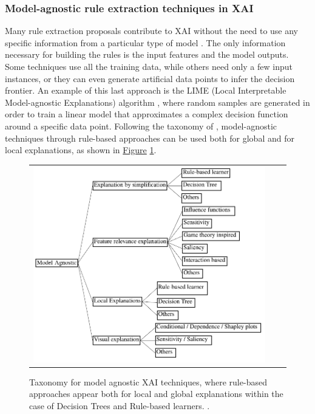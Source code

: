 \subsubsection{Model-agnostic rule extraction techniques in XAI}\label{subsubsec:ch2-sota-xai-rule-extraction-agnostic}
\leavevmode\newline
Many rule extraction proposals contribute to XAI without the need to use any specific information from a particular type of model \parencite{arrieta2020explainable}. The only information necessary for building the rules is the input features and the model outputs. Some techniques use all the training data, while others need only a few input instances, or they can even generate artificial data points to infer the decision frontier. An example of this last approach is the LIME (Local Interpretable Model-agnostic Explanations) algorithm \parencite{ribeiro2016should}, where random samples are generated in order to train a linear model that approximates a complex decision function around a specific data point. Following the taxonomy of \parencite{arrieta2020explainable}, model-agnostic techniques through rule-based approaches can be used both for global and for local explanations, as shown in \hyperref[fig:ModelAgnosticDiagram]{Figure} \ref{fig:ModelAgnosticDiagram}.

\begin{figure}[h!]
\centering
 \begin{tabular}{c@{\qquad}c@{\qquad}c}
\includegraphics[width=0.7\columnwidth]{figures/ModelAgnosticDiagram.PNG}
  \end{tabular} 
  \caption{Taxonomy for model agnostic XAI techniques, where rule-based approaches appear both for local and global explanations within the case of Decision Trees and Rule-based learners. \parencite{arrieta2020explainable}.\label{fig:ModelAgnosticDiagram}}
\end{figure}

